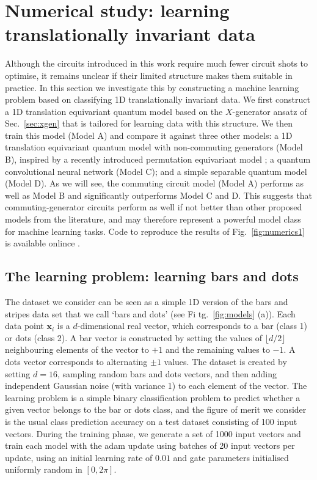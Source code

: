 \documentclass[twocolumn]{revtex4-2}
\renewcommand{\vec}{\boldsymbol}
\begin{document}
\section{Numerical study: learning translationally invariant data}\label{sec:numerics}
Although the circuits introduced in this work require much fewer circuit shots to optimise, it remains unclear if their limited structure makes them suitable in practice. In this section we investigate this by constructing a machine learning problem based on classifying 1D translationally invariant data. We first construct a 1D translation equivariant quantum model based on the $X$-generator ansatz of Sec.\ \ref{sec:xgen} that is tailored for learning data with this structure. We then train this model (Model A) and compare it against three other models: a 1D translation equivariant quantum model with non-commuting generators (Model B), inspired by a recently introduced permutation equivariant model \cite{schatzki2022theoretical}; a quantum convolutional neural network \cite{qconv,hur2022quantum} (Model C); and a simple separable quantum model (Model D). As we will see, the commuting circuit model (Model A) performs as well as Model B and significantly outperforms Model C and D. This suggests that commuting-generator circuits perform as well if not better than other proposed models from the literature, and may therefore represent a powerful model class for machine learning tasks. Code to reproduce the results of Fig.\ \ref{fig:numerics1} is available onlince \cite{backpropscalingrepo}.

\subsection{The learning problem: learning bars and dots}
The dataset we consider can be seen as a simple 1D version of the bars and stripes data set that we call `bars and dots' (see Fi tg.\ \ref{fig:models} (a)). Each data point $\vec{x}_i$ is a $d$-dimensional real vector, which corresponds to a bar (class 1) or dots (class 2). A bar vector is constructed by setting the values of $\lfloor d/2 \rfloor$ neighbouring elements of the vector to $+1$ and the remaining values to $-1$. A dots vector corresponds to alternating $\pm1$ values. The dataset is created by setting $d=16$, sampling random bars and dots vectors, and then adding independent Gaussian noise (with variance 1) to each element of the vector. The learning problem is a simple binary classification problem to predict whether a given vector belongs to the bar or dots class, and the figure of merit we consider is the usual class prediction accuracy on a test dataset consisting of 100 input vectors. During the training phase, we generate a set of 1000 input vectors and train each model with the adam update using batches of 20 input vectors per update, using an initial learning rate of $0.01$ and gate parameters initialised uniformly random in $[0,2\pi]$.
\end{document}
